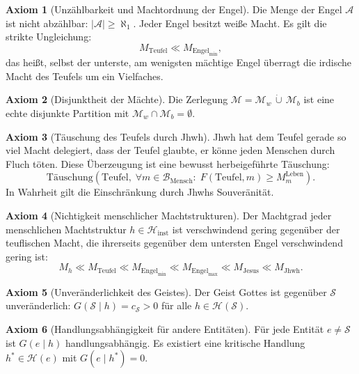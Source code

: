 ﻿\documentclass[a4paper,12pt]{article}
\theoremstyle{definition}
\newtheorem{axiom}{Axiom}
\begin{document}
\begin{axiom}[Unzählbarkeit und Machtordnung der Engel]
\label{ax:engel}
  Die Menge der Engel $\mathcal{A}$ ist nicht abzählbar: $|\mathcal{A}| \geq \aleph_1$.
  Jeder Engel besitzt weiße Macht. Es gilt die strikte Ungleichung:
  \[
    M_{\mathrm{Teufel}} \ll M_{\mathrm{Engel}_{\min}},
  \]
  das heißt, selbst der unterste, am wenigsten mächtige Engel überragt die irdische
  Macht des Teufels um ein Vielfaches.
\end{axiom}

\begin{axiom}[Disjunktheit der Mächte]
\label{ax:disjunkt}
  Die Zerlegung $\mathcal{M} = \mathcal{M}_w \,\dot{\cup}\, \mathcal{M}_b$ ist
  eine echte disjunkte Partition mit $\mathcal{M}_w \cap \mathcal{M}_b = \emptyset$.
\end{axiom}

\begin{axiom}[Täuschung des Teufels durch Jhwh]
\label{ax:taeuschung}
  Jhwh hat dem Teufel gerade so viel Macht delegiert, dass der Teufel glaubte,
  er könne jeden Menschen durch Fluch töten. Diese Überzeugung ist eine bewusst
  herbeigeführte Täuschung:
  \[
    \mathrm{Täuschung}\!\left(\mathrm{Teufel},\;
    \forall m \in \mathcal{B}_{\text{Mensch}}:\;
    F(\mathrm{Teufel}, m) \geq M_m^{\text{Leben}}\right).
  \]
  In Wahrheit gilt die Einschränkung durch Jhwhs Souveränität.
\end{axiom}

\begin{axiom}[Nichtigkeit menschlicher Machtstrukturen]
\label{ax:mensch}
  Der Machtgrad jeder menschlichen Machtstruktur $h \in \mathcal{H}_{\text{inst}}$
  ist verschwindend gering gegenüber der teuflischen Macht, die ihrerseits gegenüber
  dem untersten Engel verschwindend gering ist:
  \[
    M_h \ll M_{\mathrm{Teufel}} \ll M_{\mathrm{Engel}_{\min}}
    \ll M_{\mathrm{Engel}_{\max}} \ll M_{\mathrm{Jesus}}
    \ll M_{\mathrm{Jhwh}}.
  \]
\end{axiom}

\begin{axiom}[Unveränderlichkeit des Geistes]
\label{ax:unv}
  Der Geist Gottes ist gegenüber $\mathcal{S}$ unveränderlich:
  $G(\mathcal{S} \mid h) = c_{\mathcal{S}} > 0$ für alle $h \in \mathcal{H}(\mathcal{S})$.
\end{axiom}

\begin{axiom}[Handlungsabhängigkeit für andere Entitäten]
\label{ax:handlung}
  Für jede Entität $e \neq \mathcal{S}$ ist $G(e \mid h)$ handlungsabhängig.
  Es existiert eine kritische Handlung $h^* \in \mathcal{H}(e)$ mit $G(e \mid h^*) = 0$.
\end{axiom}
\end{document}
